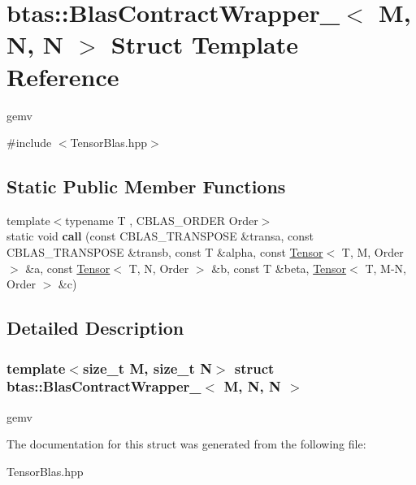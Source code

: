 \hypertarget{structbtas_1_1_blas_contract_wrapper___3_01_m_00_01_n_00_01_n_01_4}{
\section{btas::BlasContractWrapper\_\-$<$ M, N, N $>$ Struct Template Reference}
\label{structbtas_1_1_blas_contract_wrapper___3_01_m_00_01_n_00_01_n_01_4}
}


gemv  


{\ttfamily \#include $<$TensorBlas.hpp$>$}\subsection*{Static Public Member Functions}
\begin{DoxyCompactItemize}
\item 
\hypertarget{structbtas_1_1_blas_contract_wrapper___3_01_m_00_01_n_00_01_n_01_4_a0b27a35cb2a4f30fba451dabff384b9b}{
{\footnotesize template$<$typename T , CBLAS\_\-ORDER Order$>$ }\\static void {\bfseries call} (const CBLAS\_\-TRANSPOSE \&transa, const CBLAS\_\-TRANSPOSE \&transb, const T \&alpha, const \hyperlink{classbtas_1_1_tensor}{Tensor}$<$ T, M, Order $>$ \&a, const \hyperlink{classbtas_1_1_tensor}{Tensor}$<$ T, N, Order $>$ \&b, const T \&beta, \hyperlink{classbtas_1_1_tensor}{Tensor}$<$ T, M-\/N, Order $>$ \&c)}
\label{structbtas_1_1_blas_contract_wrapper___3_01_m_00_01_n_00_01_n_01_4_a0b27a35cb2a4f30fba451dabff384b9b}

\end{DoxyCompactItemize}


\subsection{Detailed Description}
\subsubsection*{template$<$size\_\-t M, size\_\-t N$>$ struct btas::BlasContractWrapper\_\-$<$ M, N, N $>$}

gemv 

The documentation for this struct was generated from the following file:\begin{DoxyCompactItemize}
\item 
TensorBlas.hpp\end{DoxyCompactItemize}
